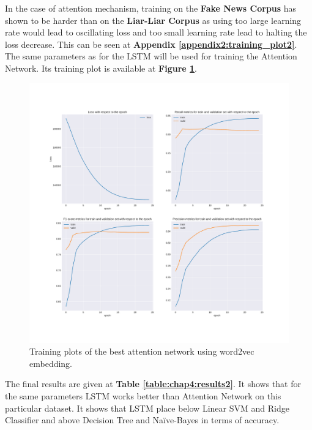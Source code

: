 In the case of attention mechanism, training on the \textbf{Fake News Corpus} has shown to be harder than on the \textbf{Liar-Liar Corpus} as using too large learning rate would lead to oscillating loss and too small learning rate lead to halting the loss decrease. This can be seen at \textbf{Appendix \ref{appendix2:training_plot2}}. \\
The same parameters as for the LSTM will be used for training the Attention Network. Its training plot is available at \textbf{Figure \ref{chap4:fig:attention5}}.
\begin{figure}
 \centering
 \includegraphics[width=\textwidth]{images/chapitre4/attention5}
 \caption{Training plots of the best attention network using word2vec embedding.}
 \label{chap4:fig:attention5}
\end{figure} 
The final results are given at \textbf{Table \ref{table:chap4:results2}}. It shows that for the same parameters LSTM works better than Attention Network on this particular dataset. It shows that LSTM place below Linear SVM and Ridge Classifier and above Decision Tree and Na\"{i}ve-Bayes in terms of accuracy. 
